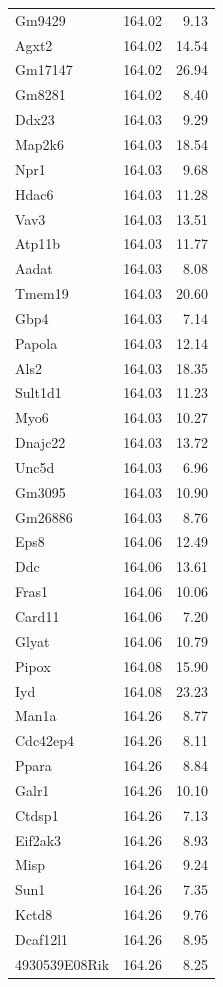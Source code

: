 \documentclass{article}
\begin{document}
\begin{boehm}
\begin{longtable}{lrr}
  Gm9429 & 164.02 & 9.13 \\
  Agxt2 & 164.02 & 14.54 \\
  Gm17147 & 164.02 & 26.94 \\
  Gm8281 & 164.02 & 8.40 \\
  Ddx23 & 164.03 & 9.29 \\
  Map2k6 & 164.03 & 18.54 \\
  Npr1 & 164.03 & 9.68 \\
  Hdac6 & 164.03 & 11.28 \\
  Vav3 & 164.03 & 13.51 \\
  Atp11b & 164.03 & 11.77 \\
  Aadat & 164.03 & 8.08 \\
  Tmem19 & 164.03 & 20.60 \\
  Gbp4 & 164.03 & 7.14 \\
  Papola & 164.03 & 12.14 \\
  Als2 & 164.03 & 18.35 \\
  Sult1d1 & 164.03 & 11.23 \\
  Myo6 & 164.03 & 10.27 \\
  Dnajc22 & 164.03 & 13.72 \\
  Unc5d & 164.03 & 6.96 \\
  Gm3095 & 164.03 & 10.90 \\
  Gm26886 & 164.03 & 8.76 \\
  Eps8 & 164.06 & 12.49 \\
  Ddc & 164.06 & 13.61 \\
  Fras1 & 164.06 & 10.06 \\
  Card11 & 164.06 & 7.20 \\
  Glyat & 164.06 & 10.79 \\
  Pipox & 164.08 & 15.90 \\
  Iyd & 164.08 & 23.23 \\
  Man1a & 164.26 & 8.77 \\
  Cdc42ep4 & 164.26 & 8.11 \\
  Ppara & 164.26 & 8.84 \\
  Galr1 & 164.26 & 10.10 \\
  Ctdsp1 & 164.26 & 7.13 \\
  Eif2ak3 & 164.26 & 8.93 \\
  Misp & 164.26 & 9.24 \\
  Sun1 & 164.26 & 7.35 \\
  Kctd8 & 164.26 & 9.76 \\
  Dcaf12l1 & 164.26 & 8.95 \\
  4930539E08Rik & 164.26 & 8.25 \\

\end{longtable}
\end{boehm}
\end{document}
